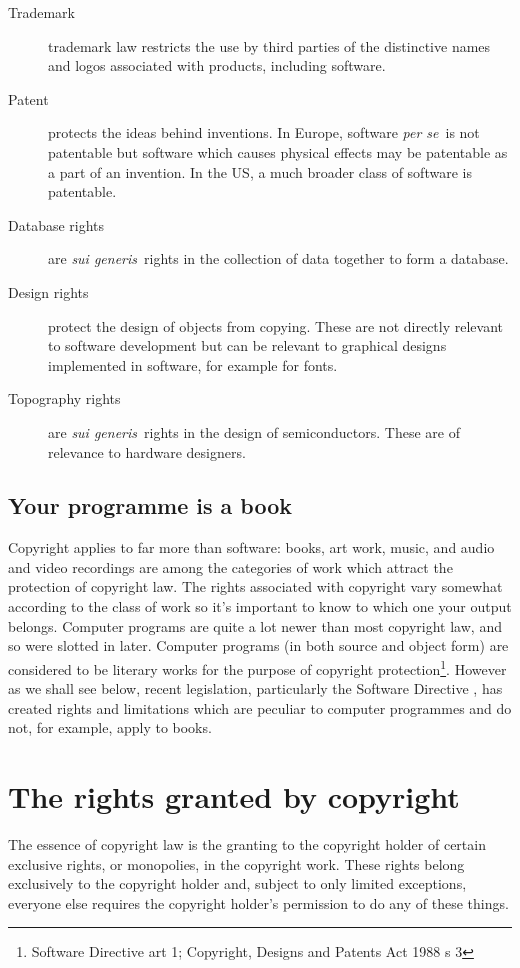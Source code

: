\documentclass[a4paper,12pt]{article}
\newcommand{\CDPA}[1][]{Copyright, Designs and Patents Act 1988 #1\xspace}
\newcommand{\SD}[1][]{Software Directive #1\xspace}
\begin{document}
\begin{description}
\item[Trademark] trademark law restricts the use by third parties of the
  distinctive names and logos associated with products, including software.
\item[Patent] protects the ideas behind inventions. In Europe, software
  \emph{per se}\ is not patentable but software which causes physical
  effects may be patentable as a part of an invention. In the US, a much
  broader class of software is patentable.
\item[Database rights] are \emph{sui generis}\ rights in the collection of
  data together to form a database.
\item[Design rights] protect the design of objects from copying. These are
  not directly relevant to software development but can be relevant to
  graphical designs implemented in software, for example for fonts.
\item[Topography rights] are \emph{sui generis}\ rights in the design of
  semiconductors. These are of relevance to hardware designers.
\end{description}

\subsection{Your programme is a book}

Copyright applies to far more than software: books, art work, music, and audio
and video recordings are among the categories of work which attract the
protection of copyright law. The rights associated with copyright vary
somewhat according to the class of work so it's important to know to which
one your output belongs. Computer programs are quite a lot newer than most copyright
law, and so were slotted in later. Computer programs (in both source and
object form) are considered to be literary works for the purpose of
copyright protection\footnote{\SD[art 1]; \CDPA[s 3]}. However as we shall
see below, recent legislation, particularly the \SD, has created
rights and limitations which are peculiar to computer programmes and do
not, for example, apply to books.

\section{The rights granted by copyright}

The essence of copyright law is the granting to the copyright holder of
certain exclusive rights, or monopolies, in the copyright work. These rights
belong exclusively to the copyright holder and, subject to only limited
exceptions, everyone else requires the copyright holder's permission to do
any of these things.
\end{document}
